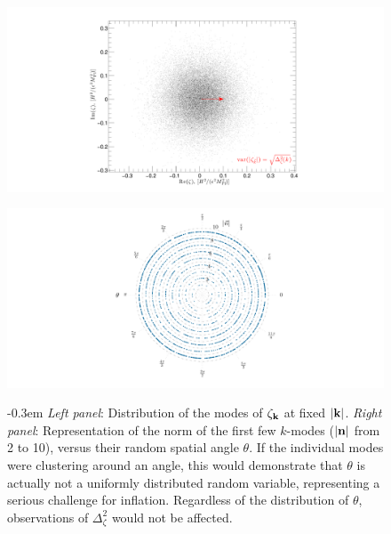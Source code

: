 \documentclass[psfig,12pt]{article}
\begin{document}
{\begin{figure}[t]
\vspace{-1cm}
\begin{center}
\centering
\begin{minipage}[t]{0.4\linewidth}
\hspace{2cm}\includegraphics[trim = 80 -32 0 50 mm, width=.8\linewidth]{figures/onemodeThetadist.pdf}\\
\end{minipage}\hfill
\begin{minipage}[t]{0.4\linewidth}
\centering\hspace{-3cm}\includegraphics[trim = 0 0 0 0 mm, clip, width=.8\linewidth]{figures/first10modesThetadist.pdf}\\
\end{minipage}
\caption{\label{f:variations} \openup -0.3em
\footnotesize{{\it Left panel}: Distribution of the modes of $\zeta_{{\bf k}}$
at fixed $|{\bf k}|$.} \small{{\it Right panel}: Representation of  the
norm of the first few $k$-modes ($|{\bf n}|$ from 2 to 10), versus their
random spatial angle $\theta$. If the individual modes were clustering
around an angle, this would demonstrate that $\theta$ is actually not a
uniformly distributed random variable, representing a serious challenge
for inflation. Regardless of the distribution of $\theta$, observations
of $\Delta_\zeta^2$ would not be affected. }
\vspace{-1cm}
}
\end{center}
\end{figure}

}
\end{document}
